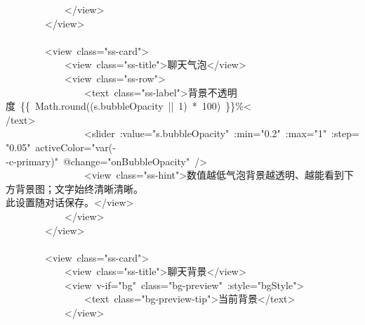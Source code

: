 \documentclass[a4paper,10pt]{article}
\begin{document}
{~~~~~~~~~~~~</view>\\
~~~~~~~~</view>\\
\mbox{}\\
~~~~~~~~<view~class="ss-card">\\
~~~~~~~~~~~~<view~class="ss-title">聊天气泡</view>\\
~~~~~~~~~~~~<view~class="ss-row">\\
~~~~~~~~~~~~~~~~<text~class="ss-label">背景不透明度~\{\{~Math.round((s.bubbleOpacity~||~1)~*~100)~\}\}\%<\\
/text>\\
~~~~~~~~~~~~~~~~<slider~:value="s.bubbleOpacity"~:min="0.2"~:max="1"~:step="0.05"~activeColor="var(-\\
-c-primary)"~@change="onBubbleOpacity"~/>\\
~~~~~~~~~~~~~~~~<view~class="ss-hint">数值越低气泡背景越透明、越能看到下方背景图；文字始终清晰清晰。\\
此设置随对话保存。</view>\\
~~~~~~~~~~~~</view>\\
~~~~~~~~</view>\\
\mbox{}\\
~~~~~~~~<view~class="ss-card">\\
~~~~~~~~~~~~<view~class="ss-title">聊天背景</view>\\
~~~~~~~~~~~~<view~v-if="bg"~class="bg-preview"~:style="bgStyle">\\
~~~~~~~~~~~~~~~~<text~class="bg-preview-tip">当前背景</text>\\
~~~~~~~~~~~~</view>
}

\newpage
\end{document}
